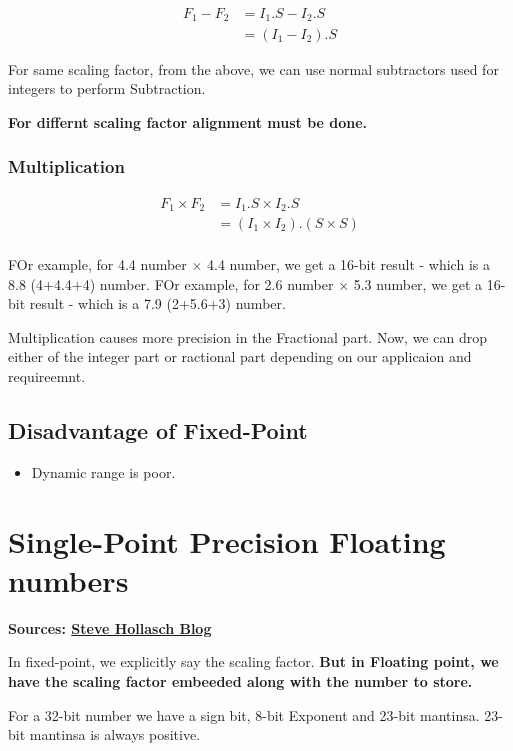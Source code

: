 \documentclass{article}
\begin{document}
\begin{align*}
    F_1 - F_2 & = I_1.S - I_2.S \\
              & = (I_1 - I_2).S
\end{align*}

For same scaling factor, from the above, we can use normal subtractors used for integers to perform Subtraction.

\textbf{For differnt scaling factor alignment must be done.}

\subsubsection{Multiplication}

\begin{align*}
    F_1 \times F_2 & = I_1.S \times I_2.S             \\
                   & = (I_1 \times I_2). (S \times S) \\
\end{align*}

FOr example, for 4.4 number $\times$ 4.4 number, we get a 16-bit result - which is a 8.8 (4+4.4+4) number.
FOr example, for 2.6 number $\times$ 5.3 number, we get a 16-bit result - which is a 7.9 (2+5.6+3) number.

Multiplication causes more precision in the Fractional part.
Now, we can drop either of the integer part or ractional part depending on our applicaion and requireemnt.


\subsection{Disadvantage of Fixed-Point}
\begin{itemize}
    \item Dynamic range is poor.
\end{itemize}

\section{Single-Point Precision Floating numbers}

\textbf{Sources: \href{http://steve.hollasch.net/cgindex/coding/ieeefloat.html}{Steve Hollasch Blog}}

In fixed-point, we explicitly say the scaling factor.
\textbf{But in Floating point, we have the scaling factor embeeded along with the number to store.}

For a 32-bit number we have a sign bit, 8-bit Exponent and 23-bit mantinsa.
23-bit mantinsa is always positive.
\end{document}
